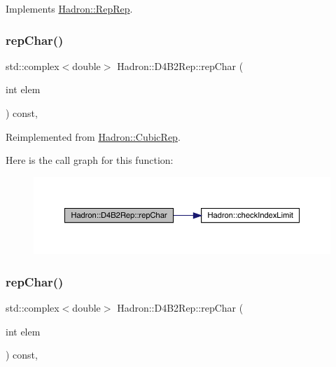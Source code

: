 Implements \mbox{\hyperlink{structHadron_1_1RepRep_ab3213025f6de249f7095892109575fde}{Hadron\+::\+Rep\+Rep}}.

\mbox{\label{structHadron_1_1D4B2Rep_a23d3d1b8d91d37f5d2c70f3ea7950ab7}} 
\subsubsection{\texorpdfstring{repChar()}{repChar()}\hspace{0.1cm}{\footnotesize\ttfamily [1/3]}}
{\footnotesize\ttfamily std\+::complex$<$double$>$ Hadron\+::\+D4\+B2\+Rep\+::rep\+Char (\begin{DoxyParamCaption}\item[{int}]{elem }\end{DoxyParamCaption}) const\hspace{0.3cm}{\ttfamily [inline]}, {\ttfamily [virtual]}}



Reimplemented from \mbox{\hyperlink{structHadron_1_1CubicRep_af45227106e8e715e84b0af69cd3b36f8}{Hadron\+::\+Cubic\+Rep}}.

Here is the call graph for this function\+:
\nopagebreak
\begin{figure}[H]
\begin{center}
\leavevmode
\includegraphics[width=350pt]{d0/d07/structHadron_1_1D4B2Rep_a23d3d1b8d91d37f5d2c70f3ea7950ab7_cgraph}
\end{center}
\end{figure}
\mbox{\label{structHadron_1_1D4B2Rep_a23d3d1b8d91d37f5d2c70f3ea7950ab7}} 
\subsubsection{\texorpdfstring{repChar()}{repChar()}\hspace{0.1cm}{\footnotesize\ttfamily [2/3]}}
{\footnotesize\ttfamily std\+::complex$<$double$>$ Hadron\+::\+D4\+B2\+Rep\+::rep\+Char (\begin{DoxyParamCaption}\item[{int}]{elem }\end{DoxyParamCaption}) const\hspace{0.3cm}{\ttfamily [inline]}, {\ttfamily [virtual]}}



